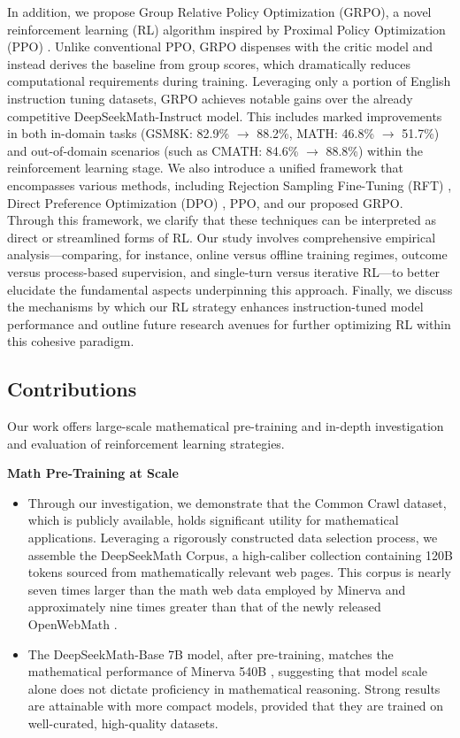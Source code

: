 In addition, we propose Group Relative Policy Optimization (GRPO), a novel reinforcement learning (RL) algorithm inspired by Proximal Policy Optimization (PPO) \citep{schulman2017proximal}. Unlike conventional PPO, GRPO dispenses with the critic model and instead derives the baseline from group scores, which dramatically reduces computational requirements during training. Leveraging only a portion of English instruction tuning datasets, GRPO achieves notable gains over the already competitive DeepSeekMath-Instruct model. This includes marked improvements in both in-domain tasks (GSM8K: 82.9\% $\rightarrow$ 88.2\%, MATH: 46.8\% $\rightarrow$ 51.7\%) and out-of-domain scenarios (such as CMATH: 84.6\% $\rightarrow$ 88.8\%) within the reinforcement learning stage. We also introduce a unified framework that encompasses various methods, including Rejection Sampling Fine-Tuning (RFT) \citep{yuan2023scaling}, Direct Preference Optimization (DPO) \citep{dpo}, PPO, and our proposed GRPO. Through this framework, we clarify that these techniques can be interpreted as direct or streamlined forms of RL. Our study involves comprehensive empirical analysis—comparing, for instance, online versus offline training regimes, outcome versus process-based supervision, and single-turn versus iterative RL—to better elucidate the fundamental aspects underpinning this approach. Finally, we discuss the mechanisms by which our RL strategy enhances instruction-tuned model performance and outline future research avenues for further optimizing RL within this cohesive paradigm.

\subsection{Contributions}
Our work offers large-scale mathematical pre-training and in-depth investigation and evaluation of reinforcement learning strategies.

\textbf{Math Pre-Training at Scale}

\begin{itemize}[topsep=0pt]
    \item Through our investigation, we demonstrate that the Common Crawl dataset, which is publicly available, holds significant utility for mathematical applications. Leveraging a rigorously constructed data selection process, we assemble the DeepSeekMath Corpus, a high-caliber collection containing 120B tokens sourced from mathematically relevant web pages. This corpus is nearly seven times larger than the math web data employed by Minerva \citep{minerva} and approximately nine times greater than that of the newly released OpenWebMath \citep{openwebmath}.

    \item The DeepSeekMath-Base 7B model, after pre-training, matches the mathematical performance of Minerva 540B \citep{minerva}, suggesting that model scale alone does not dictate proficiency in mathematical reasoning. Strong results are attainable with more compact models, provided that they are trained on well-curated, high-quality datasets.
\end{itemize}

